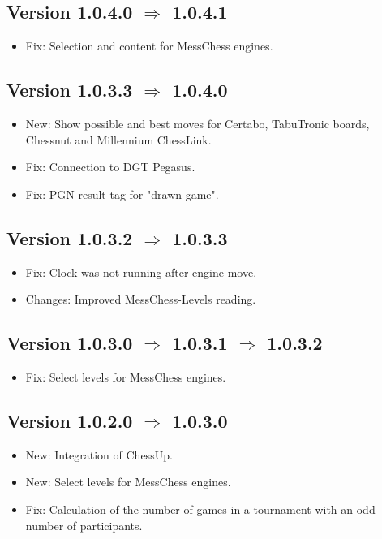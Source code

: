 \documentclass[11pt,a4paper]{article}
\begin{document}
\subsection*{Version 1.0.4.0 $\Rightarrow$  1.0.4.1}
\begin{itemize}		
	\item {\color{red}Fix}: Selection and content for MessChess engines.	
\end{itemize}

\subsection*{Version 1.0.3.3 $\Rightarrow$  1.0.4.0}
\begin{itemize}		
    \item {\color{blue}New}: Show possible and best moves for Certabo, TabuTronic boards, Chessnut and Millennium ChessLink.
    \item {\color{red}Fix}: Connection to DGT Pegasus.
	\item {\color{red}Fix}: PGN result tag for "drawn game".
\end{itemize}


\subsection*{Version 1.0.3.2 $\Rightarrow$  1.0.3.3}
\begin{itemize}		
	\item {\color{red}Fix}: Clock was not running after engine move.
	\item {\color{teal}Changes}: Improved MessChess-Levels reading.
\end{itemize}


\subsection*{Version 1.0.3.0 $\Rightarrow$  1.0.3.1 $\Rightarrow$  1.0.3.2}
\begin{itemize}		
	\item {\color{red}Fix}: Select levels for MessChess engines.
\end{itemize}

\subsection*{Version 1.0.2.0 $\Rightarrow$  1.0.3.0}
\begin{itemize}		
	\item {\color{blue}New}: Integration of ChessUp.
	\item {\color{blue}New}: Select levels for MessChess engines.
	\item {\color{red}Fix}: Calculation of the number of games in a tournament with an odd number of participants.
\end{itemize}
\end{document}
